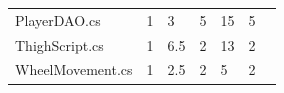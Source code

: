 \begin{table}[htp]
\begin{tabular}{lllllll}
PlayerDAO.cs & 1\cellcolor[HTML]{9AFF99} & 3\cellcolor[HTML]{9AFF99} & 5\cellcolor[HTML]{FFCE93} & 15\cellcolor[HTML]{9AFF99} & 5\cellcolor[HTML]{9AFF99} \\
ThighScript.cs & 1\cellcolor[HTML]{9AFF99} & 6.5\cellcolor[HTML]{9AFF99} & 2\cellcolor[HTML]{FFFC9E} & 13\cellcolor[HTML]{9AFF99} & 2\cellcolor[HTML]{9AFF99} \\
WheelMovement.cs & 1\cellcolor[HTML]{9AFF99} & 2.5\cellcolor[HTML]{9AFF99} & 2\cellcolor[HTML]{FFFC9E} & 5\cellcolor[HTML]{9AFF99} & 2\cellcolor[HTML]{9AFF99} \\\hline
\end{tabular}
\end{table}
